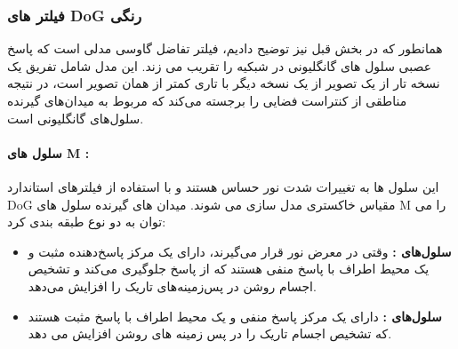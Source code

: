             \subsubsection*{فیلتر های DoG رنگی}
                همانطور که در بخش قبل نیز توضیح دادیم، فیلتر تفاضل گاوسی مدلی است که پاسخ عصبی سلول های گانگلیونی در شبکیه را تقریب می زند. این مدل شامل تفریق یک نسخه تار از یک تصویر از یک نسخه دیگر با تاری کمتر از همان تصویر است، در نتیجه مناطقی از کنتراست فضایی را برجسته می‌کند که مربوط به میدان‌های گیرنده سلول‌های گانگلیونی است.
                \paragraph*{سلول های M :} این سلول ها به تغییرات شدت نور حساس هستند و با استفاده از فیلترهای استاندارد DoG 
                مقیاس خاکستری مدل سازی می شوند. میدان های گیرنده سلول های 
                M 
                را می توان به دو نوع طبقه بندی کرد:
                \begin{itemize}
                    \item \textbf{سلول‌های :} وقتی در معرض نور قرار می‌گیرند، دارای یک مرکز پاسخ‌دهنده مثبت و یک محیط اطراف با پاسخ منفی هستند که از پاسخ جلوگیری می‌کند و تشخیص اجسام روشن در پس‌زمینه‌های تاریک را افزایش می‌دهد.
                    \item \textbf{سلول‌های :} دارای یک مرکز پاسخ منفی و یک محیط اطراف با پاسخ مثبت هستند که تشخیص اجسام تاریک را در پس زمینه های روشن افزایش می دهد.
                \end{itemize}
